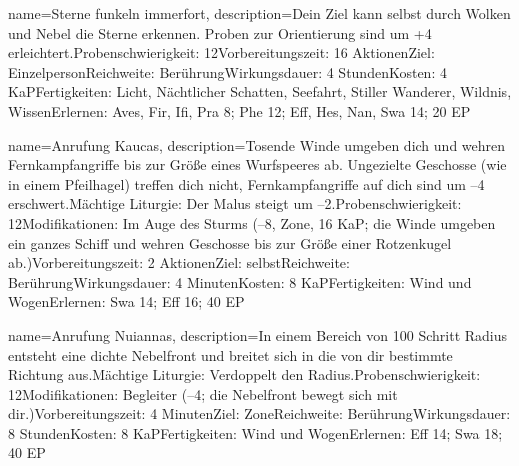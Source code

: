 {
    name={Sterne funkeln immerfort},
    description={Dein Ziel kann selbst durch Wolken und Nebel die Sterne erkennen. Proben zur Orientierung sind um +4 erleichtert.\newline Probenschwierigkeit: 12\newline Vorbereitungszeit: 16 Aktionen\newline Ziel: Einzelperson\newline Reichweite: Berührung\newline Wirkungsdauer: 4 Stunden\newline Kosten: 4 KaP\newline Fertigkeiten: Licht, Nächtlicher Schatten, Seefahrt, Stiller Wanderer, Wildnis, Wissen\newline Erlernen: Aves, Fir, Ifi, Pra 8; Phe 12; Eff, Hes, Nan, Swa 14; 20 EP}
}


{
    name={Anrufung Kaucas},
    description={Tosende Winde umgeben dich und wehren Fernkampfangriffe bis zur Größe eines Wurfspeeres ab. Ungezielte Geschosse (wie in einem Pfeilhagel) treffen dich nicht, Fernkampfangriffe auf dich sind um –4 erschwert.\newline Mächtige Liturgie: Der Malus steigt um –2.\newline Probenschwierigkeit: 12\newline Modifikationen: Im Auge des Sturms (–8, Zone, 16 KaP; die Winde umgeben ein ganzes Schiff und wehren Geschosse bis zur Größe einer Rotzenkugel ab.)\newline Vorbereitungszeit: 2 Aktionen\newline Ziel: selbst\newline Reichweite: Berührung\newline Wirkungsdauer: 4 Minuten\newline Kosten: 8 KaP\newline Fertigkeiten: Wind und Wogen\newline Erlernen: Swa 14; Eff 16; 40 EP}
}


{
    name={Anrufung Nuiannas},
    description={In einem Bereich von 100 Schritt Radius entsteht eine dichte Nebelfront und breitet sich in die von dir bestimmte Richtung aus.\newline Mächtige Liturgie: Verdoppelt den Radius.\newline Probenschwierigkeit: 12\newline Modifikationen: Begleiter (–4; die Nebelfront bewegt sich mit dir.)\newline Vorbereitungszeit: 4 Minuten\newline Ziel: Zone\newline Reichweite: Berührung\newline Wirkungsdauer: 8 Stunden\newline Kosten: 8 KaP\newline Fertigkeiten: Wind und Wogen\newline Erlernen: Eff 14; Swa 18; 40 EP}
}


